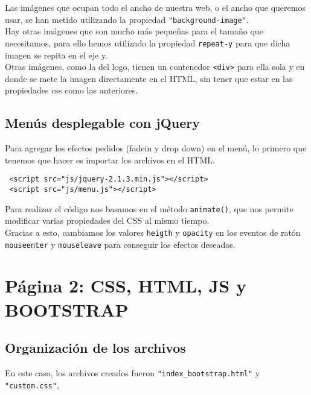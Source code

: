 \documentclass[10pt,a4paper]{article}
\begin{document}
Las imágenes que ocupan todo el ancho de nuestra web, o el ancho que queremos usar, se han metido utilizando la propiedad \texttt{"background-image"}.\\


Hay otras imágenes que son mucho más pequeñas para el tamaño que necesitamos, para ello hemos utilizado la propiedad \texttt{repeat-y} para que dicha imagen se repita en el eje y.\\


Otras imágenes, como la del logo, tienen un contenedor \texttt{<div>} para ella sola y en donde se mete la imagen directamente en el HTML, sin tener que estar en las propiedades css como las anteriores. 



\subsection{Menús desplegable con jQuery}

Para agregar los efectos pedidos (fadein y drop down) en el menú, lo primero que tenemos que hacer es importar los archivos en el HTML.

\begin{verbatim}
 <script src="js/jquery-2.1.3.min.js"></script>
 <script src="js/menu.js"></script>
\end{verbatim}
 
Para realizar el código nos basamos en el método \texttt{animate()}, que nos permite modificar varias propiedades del CSS al mismo tiempo.\\

Gracias a esto, cambiamos los valores \texttt{heigth} y \texttt{opacity} en los eventos de ratón \texttt{mouseenter} y \texttt{mouseleave} para conseguir los efectos deseados.

\section{Página 2: CSS, HTML, JS y BOOTSTRAP}

\subsection{Organización de los archivos}
En este caso, los archivos creados fueron \texttt{"index\_bootstrap.html"} y \texttt{"custom.css"},
\end{document}
